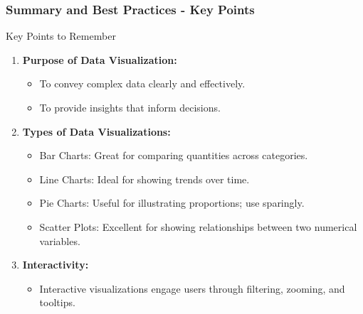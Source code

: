 \documentclass[aspectratio=169]{beamer}
\begin{document}
\begin{frame}[fragile]
    \frametitle{Summary and Best Practices - Key Points}
    \begin{block}{Key Points to Remember}
        \begin{enumerate}
            \item \textbf{Purpose of Data Visualization:}
                \begin{itemize}
                    \item To convey complex data clearly and effectively.
                    \item To provide insights that inform decisions.
                \end{itemize}
            \item \textbf{Types of Data Visualizations:}
                \begin{itemize}
                    \item Bar Charts: Great for comparing quantities across categories.
                    \item Line Charts: Ideal for showing trends over time.
                    \item Pie Charts: Useful for illustrating proportions; use sparingly.
                    \item Scatter Plots: Excellent for showing relationships between two numerical variables.
                \end{itemize}
            \item \textbf{Interactivity:}
                \begin{itemize}
                    \item Interactive visualizations engage users through filtering, zooming, and tooltips.
                \end{itemize}
        \end{enumerate}
    \end{block}
\end{frame}
\end{document}
